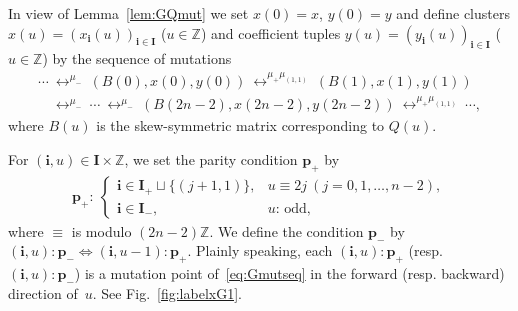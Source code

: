 \documentclass[pdftex]{sigma}
\numberwithin{equation}{section}
\theoremstyle{definition}
\begin{document}
In view of Lemma~\ref{lem:GQmut}
we set $x(0)=x$, $y(0)=y$ and def\/ine
clusters $x(u)=(x_{\mathbf{i}}(u))_{\mathbf{i}\in \mathbf{I}}$
 ($u\in \mathbb{Z}$)
 and coef\/f\/icient tuples $y(u)=(y_\mathbf{i}(u))_{\mathbf{i}\in \mathbf{I}}$
 ($u\in \mathbb{Z}$)
by the sequence of mutations
\begin{gather}
\cdots
\ \mathop{\longleftrightarrow}^{\mu_-}\
(B(0),x(0),y(0))
\ \mathop{\longleftrightarrow}^{\mu_+
\mu_{(1,1)}}\
(B(1),x(1),y(1))\nonumber\\
\phantom{\cdots}{} \ \mathop{\longleftrightarrow}^{\mu_-}\
\cdots
\ \mathop{\longleftrightarrow}^{\mu_-}\
(B(2n-2),x(2n-2),y(2n-2))
\ \mathop{\longleftrightarrow}^{\mu_+
\mu_{(1,1)}}\
\cdots,\label{eq:Gmutseq}
\end{gather}
where $B(u)$ is the skew-symmetric matrix corresponding to
$Q(u)$.

For  $(\mathbf{i},u)\in
 \mathbf{I}\times \mathbb{Z}$,
we set the parity condition $\mathbf{p}_+$ by
\begin{gather}
\label{eq:GQparity}
\mathbf{p}_+: \
\begin{cases}
 \mathbf{i}\in
\mathbf{I}_+ \sqcup
\{(j+1,1)\},
& u\equiv 2j
\ (j=0,1,\dots,n-2),\\
 \mathbf{i}\in
\mathbf{I}_-,
& \mbox{$u$: odd},
\end{cases}
\end{gather}
where $\equiv$ is modulo $(2n-2)\mathbb{Z}$.
We def\/ine the condition $\mathbf{p}_-$
by $(\mathbf{i},u):\mathbf{p}_- \Longleftrightarrow
(\mathbf{i},u-1):\mathbf{p}_+$.
Plainly speaking,
each $(\mathbf{i},u):\mathbf{p}_+$
(resp.\ $(\mathbf{i},u):\mathbf{p}_-$)
is a mutation point of~\eqref{eq:Gmutseq} in the forward
(resp. backward) direction of~$u$.
See Fig.~\ref{fig:labelxG1}.
\end{document}
